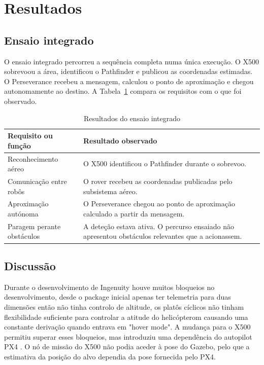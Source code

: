 \documentclass[conference]{IEEEtran}
\begin{document}
\section{Resultados}
\subsection{Ensaio integrado}

O ensaio integrado percorreu a sequência completa numa única execução. O X500 sobrevoou a área, identificou o Pathfinder e publicou as coordenadas estimadas. O Perseverance recebeu a mensagem, calculou o ponto de aproximação e chegou autonomamente ao destino. A Tabela~\ref{tab:resultados} compara os requisitos com o que foi observado.

\begin{table}[!t]
\caption{Resultados do ensaio integrado}
\label{tab:resultados}
\centering
\footnotesize
\setlength{\tabcolsep}{4pt}
\renewcommand{\arraystretch}{1.15}
\begin{tabularx}{\columnwidth}{@{}>{\raggedright\arraybackslash}p{}>{\raggedright\arraybackslash}X@{}}
\toprule
\textbf{Requisito ou função} & \textbf{Resultado observado} \\
\midrule
Reconhecimento aéreo & O X500 identificou o Pathfinder durante o sobrevoo. \\
Comunicação entre robôs & O rover recebeu as coordenadas publicadas pelo subsistema aéreo. \\
Aproximação autónoma & O Perseverance chegou ao ponto de aproximação calculado a partir da mensagem. \\
Paragem perante obstáculos & A deteção estava ativa. O percurso ensaiado não apresentou obstáculos relevantes que a acionassem. \\
\bottomrule
\end{tabularx}
\end{table}

\subsection{Discussão}

Durante o desenvolvimento de Ingenuity \cite{spaceros-demo} houve muitos bloqueios no desenvolvimento, desde o package inicial apenas ter telemetria para duas dimensões então não tinha controlo de altitude, os platôs cíclicos não tinham flexibilidade suficiente para controlar a atitude do helicópterom causando uma constante derivação quando entrava em "hover mode". A mudança para o X500 permitiu superar esses bloqueios, mas introduziu uma dependência do autopilot PX4 \cite{px4-ros2}. O nó de missão do X500 não podia aceder à pose do Gazebo, pelo que a estimativa da posição do alvo dependia da pose fornecida pelo PX4.
\end{document}
